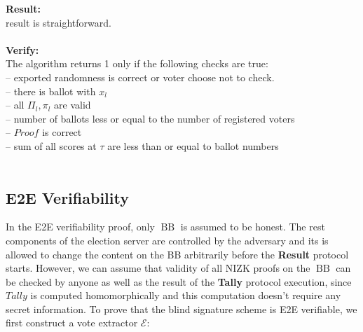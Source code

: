 \documentclass[12pt]{article}
\DeclareMathOperator{\bb}{BB}
\begin{document}
\textbf{Result:} \\
result is straightforward.\\\\
\textbf{Verify:} \\
The algorithm returns 1 only if the following checks are true:\\
--  exported randomness is correct or voter choose not to check.\\
-- there is ballot with $x_l$\\
-- all $\Pi_l, \pi_l$ are valid\\
-- number of ballots less or equal to the number of registered voters\\
-- $Proof$ is correct\\
-- sum of all scores at $\tau$ are less than or equal to ballot numbers\\\\
\subsection{E2E Verifiability}
In the E2E verifiability proof, only $\bb$ is assumed to be honest. The rest components of the election server are controlled by the adversary and its is allowed to change the content on the BB arbitrarily before the \textbf{Result} protocol starts. However, we can assume that validity of all NIZK proofs on the $\bb$ can be checked by anyone as well as the result of the \textbf{Tally} protocol execution, since $Tally$ is computed homomorphically and this computation doesn't require any secret information. To prove that the blind signature scheme is E2E verifiable, we first construct a vote extractor $\mathcal{E}$:\\
 
\end{document}
